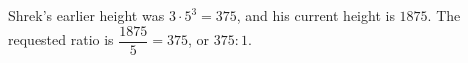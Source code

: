 Shrek's earlier height was $3\cdot5^3=375$, and his current height is $1875$. The requested ratio is $\dfrac{1875}{5}=\boxed{375}$, or $375:1$.
